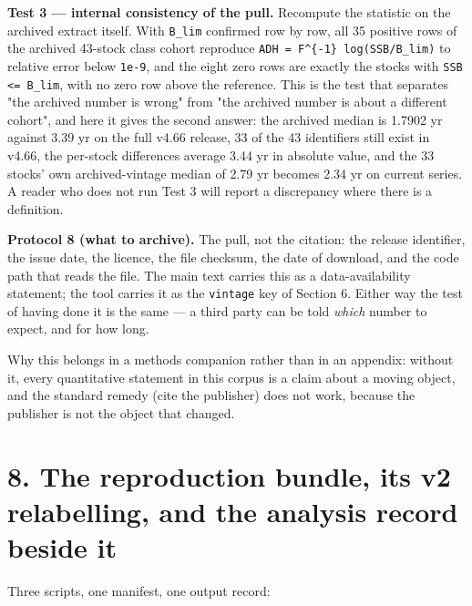 \documentclass[11pt]{article}
\begin{document}
\textbf{Test 3 --- internal consistency of the pull.} Recompute the statistic on the archived extract itself. With \texttt{B\_lim} confirmed row by row, all 35 positive rows of the archived 43-stock class cohort reproduce \texttt{ADH = F\textasciicircum{}\{-1\} log(SSB/B\_lim)} to relative error below \texttt{1e-9}, and the eight zero rows are exactly the stocks with \texttt{SSB <= B\_lim}, with no zero row above the reference. This is the test that separates "the archived number is wrong" from "the archived number is about a different cohort", and here it gives the second answer: the archived median is 1.7902 yr against 3.39 yr on the full v4.66 release, 33 of the 43 identifiers still exist in v4.66, the per-stock differences average 3.44 yr in absolute value, and the 33 stocks' own archived-vintage median of 2.79 yr becomes 2.34 yr on current series. A reader who does not run Test 3 will report a discrepancy where there is a definition.

\textbf{Protocol 8 (what to archive).} The pull, not the citation: the release identifier, the issue date, the licence, the file checksum, the date of download, and the code path that reads the file. The main text carries this as a data-availability statement; the tool carries it as the \texttt{vintage} key of Section 6. Either way the test of having done it is the same --- a third party can be told \emph{which} number to expect, and for how long.

Why this belongs in a methods companion rather than in an appendix: without it, every quantitative statement in this corpus is a claim about a moving object, and the standard remedy (cite the publisher) does not work, because the publisher is not the object that changed.

\vspace{0.8em}

\section*{8. The reproduction bundle, its v2 relabelling, and the analysis record beside it}\label{8-the-reproduction-bundle-its-v2-relabelling-and-the-analysis-record-b}

Three scripts, one manifest, one output record:
\end{document}
